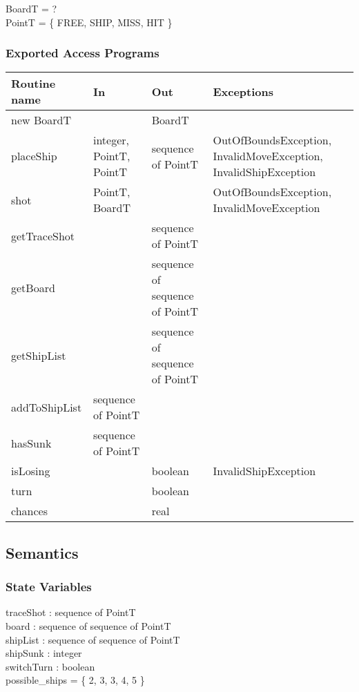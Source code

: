 \documentclass[12pt]{article}
\begin{document}
BoardT = ? \\
PointT = \{ FREE, SHIP, MISS, HIT \} \\

\subsubsection* {Exported Access Programs}

\begin{tabular}{| l | l | l | p{5cm} |}
\hline
\textbf{Routine name} & \textbf{In} & \textbf{Out} & \textbf{Exceptions}\\
\hline
new BoardT & ~ & BoardT & ~\\
\hline
placeShip & integer, PointT, PointT & sequence of PointT & OutOfBoundsException, InvalidMoveException, InvalidShipException\\
\hline
shot & PointT, BoardT & ~ & OutOfBoundsException, InvalidMoveException\\
\hline
getTraceShot & ~ & sequence of PointT & ~\\
\hline 
getBoard & ~ & sequence of sequence of PointT & ~\\
\hline 
getShipList & ~ & sequence of sequence of PointT & ~\\
\hline
addToShipList & sequence of PointT & ~ & ~\\
\hline
hasSunk & sequence of PointT & ~ & ~\\
\hline
isLosing & ~ & boolean & InvalidShipException\\
\hline
turn & ~ & boolean & ~\\
\hline
chances & ~ & real & ~\\
\hline

\end{tabular}

\subsection* {Semantics}

\subsubsection* {State Variables}

traceShot : sequence of PointT \\
board : sequence of sequence of PointT\\
shipList : sequence of sequence of PointT\\
shipSunk : integer \\
switchTurn : boolean \\
possible\_ships = \{ 2, 3, 3, 4, 5 \}
\end{document}
